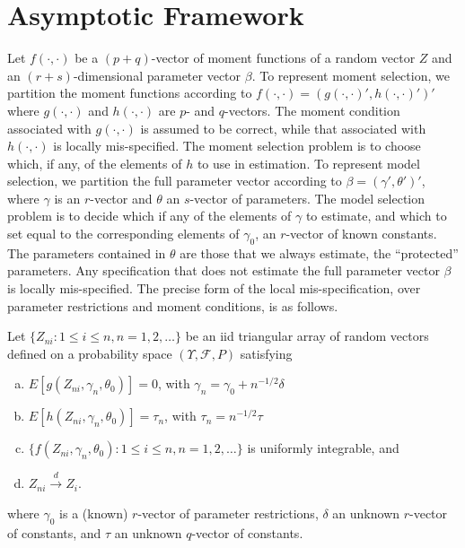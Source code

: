 \section{Asymptotic Framework}
\label{sec:asymp}
Let $f(\cdot, \cdot)$ be a $(p+q)$-vector of moment functions of a random vector $Z$ and an $(r+s)$-dimensional parameter vector $\beta$.
To represent moment selection, we partition the moment functions according to $f(\cdot,\cdot) = \left(g(\cdot, \cdot)', h(\cdot, \cdot)'\right)'$ where $g(\cdot, \cdot)$ and $h(\cdot, \cdot)$ are $p$- and $q$-vectors.
The moment condition associated with $g(\cdot, \cdot)$ is assumed to be correct, while that associated with $h(\cdot,\cdot)$ is locally mis-specified.  
The moment selection problem is to choose which, if any, of the elements of $h$ to use in estimation. 
To represent model selection, we partition the full parameter vector according to $\beta = \left(\gamma', \theta'\right)'$, where $\gamma$ is an $r$-vector and $\theta$ an $s$-vector of parameters.
The model selection problem is to decide which if any of the elements of $\gamma$ to estimate, and which to set equal to the corresponding elements of $\gamma_0$, an $r$-vector of known constants.
The parameters contained in $\theta$ are those that we always estimate, the ``protected'' parameters.
Any specification that does not estimate the full parameter vector $\beta$ is locally mis-specified.
The precise form of the local mis-specification, over parameter restrictions and moment conditions, is as follows.

\begin{assump}
\label{assump:local}
Let $\{Z_{ni}\colon 1\leq i \leq n, n =1, 2, \hdots\}$ be an iid triangular array of random vectors defined on a probability space $(\Upsilon, \mathcal{F},P)$ satisfying
	\begin{enumerate}[(a)]
    \item $E[g(Z_{ni}, \gamma_n,\theta_0)]=0$, with $\gamma_n = \gamma_0 + n^{-1/2} \delta$
    \item $E[h\left( Z_{ni}, \gamma_n, \theta_0\right)] = \tau_n$, with $\tau_n = n^{-1/2} \tau$
		\item $\{f(Z_{ni}, \gamma_n, \theta_0)\colon 1\leq i \leq n, n = 1, 2, \hdots \}$ is uniformly integrable, and 
		\item $Z_{ni}\overset{d}{\rightarrow} Z_i$.
	\end{enumerate}
	where $\gamma_0$ is a (known) $r$-vector of parameter restrictions, $\delta$ an unknown $r$-vector of constants, and $\tau$ an unknown $q$-vector of constants.
\end{assump}

